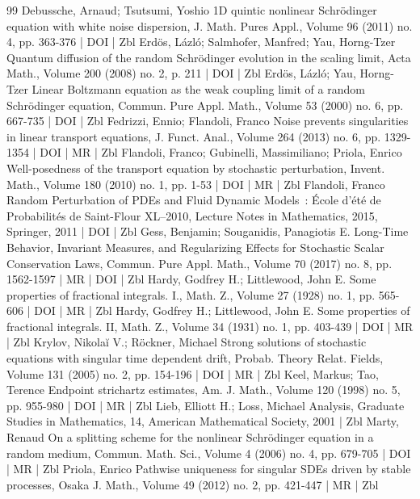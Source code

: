 \begin{thebibliography}{99}
Debussche, Arnaud; Tsutsumi, Yoshio 1D quintic nonlinear Schrödinger equation with white noise dispersion, J. Math. Pures Appl., Volume 96 (2011) no. 4, pp. 363-376 | DOI | Zbl
Erdös, Lázló; Salmhofer, Manfred; Yau, Horng-Tzer Quantum diffusion of the random Schrödinger evolution in the scaling limit, Acta Math., Volume 200 (2008) no. 2, p. 211 | DOI | Zbl
Erdös, Lázló; Yau, Horng-Tzer Linear Boltzmann equation as the weak coupling limit of a random Schrödinger equation, Commun. Pure Appl. Math., Volume 53 (2000) no. 6, pp. 667-735 | DOI | Zbl
Fedrizzi, Ennio; Flandoli, Franco Noise prevents singularities in linear transport equations, J. Funct. Anal., Volume 264 (2013) no. 6, pp. 1329-1354 | DOI | MR | Zbl
Flandoli, Franco; Gubinelli, Massimiliano; Priola, Enrico Well-posedness of the transport equation by stochastic perturbation, Invent. Math., Volume 180 (2010) no. 1, pp. 1-53 | DOI | MR | Zbl
Flandoli, Franco Random Perturbation of PDEs and Fluid Dynamic Models : École d’été de Probabilités de Saint-Flour XL–2010, Lecture Notes in Mathematics, 2015, Springer, 2011 | DOI | Zbl
Gess, Benjamin; Souganidis, Panagiotis E. Long-Time Behavior, Invariant Measures, and Regularizing Effects for Stochastic Scalar Conservation Laws, Commun. Pure Appl. Math., Volume 70 (2017) no. 8, pp. 1562-1597 | MR | DOI | Zbl
Hardy, Godfrey H.; Littlewood, John E. Some properties of fractional integrals. I., Math. Z., Volume 27 (1928) no. 1, pp. 565-606 | DOI | MR | Zbl
Hardy, Godfrey H.; Littlewood, John E. Some properties of fractional integrals. II, Math. Z., Volume 34 (1931) no. 1, pp. 403-439 | DOI | MR | Zbl
Krylov, Nikolaĭ V.; Röckner, Michael Strong solutions of stochastic equations with singular time dependent drift, Probab. Theory Relat. Fields, Volume 131 (2005) no. 2, pp. 154-196 | DOI | MR | Zbl
Keel, Markus; Tao, Terence Endpoint strichartz estimates, Am. J. Math., Volume 120 (1998) no. 5, pp. 955-980 | DOI | MR | Zbl
Lieb, Elliott H.; Loss, Michael Analysis, Graduate Studies in Mathematics, 14, American Mathematical Society, 2001 | Zbl
Marty, Renaud On a splitting scheme for the nonlinear Schrödinger equation in a random medium, Commun. Math. Sci., Volume 4 (2006) no. 4, pp. 679-705 | DOI | MR | Zbl
Priola, Enrico Pathwise uniqueness for singular SDEs driven by stable processes, Osaka J. Math., Volume 49 (2012) no. 2, pp. 421-447 | MR | Zbl

\end{thebibliography}
